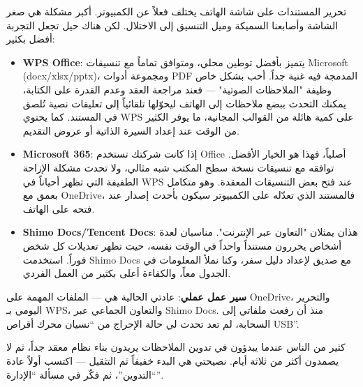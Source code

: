 


تحرير المستندات على شاشة الهاتف يختلف فعلاً عن الكمبيوتر. أكبر مشكلة هي صغر الشاشة وأصابعنا السميكة وميل التنسيق إلى الاختلال. لكن هناك حيل تجعل التجربة أفضل بكثير:

\begin{itemize}
  \item \textbf{WPS Office}: يتميز بأفضل توطين محلي، ومتوافق تماماً مع تنسيقات Microsoft (docx/xlsx/pptx)، ومجموعة أدوات PDF المدمجة فيه غنية جداً. أحب بشكل خاص وظيفة "الملاحظات الصوتية" — فعند مراجعة العقد وعدم القدرة على الكتابة، يمكنك التحدث ببضع ملاحظات إلى الهاتف ليحوّلها تلقائياً إلى تعليقات نصية تُلصق في المستند. كما يحتوي WPS على كمية هائلة من القوالب المجانية، ما يوفر الكثير من الوقت عند إعداد السيرة الذاتية أو عروض التقديم.
  \item \textbf{Microsoft 365}: إذا كانت شركتك تستخدم Office أصلياً، فهذا هو الخيار الأفضل. توافقه مع تنسيقات نسخة سطح المكتب شبه مثالي، ولا تحدث مشكلة الإزاحة الطفيفة التي تظهر أحياناً في WPS عند فتح بعض التنسيقات المعقدة. وهو متكامل بعمق مع OneDrive، فالمستند الذي تعدّله على الكمبيوتر سيكون بأحدث إصدار عند فتحه على الهاتف.
  \item \textbf{Shimo Docs/Tencent Docs}: هذان يمثلان "التعاون عبر الإنترنت". مناسبان لعدة أشخاص يحررون مستنداً واحداً في الوقت نفسه، حيث تظهر تعديلات كل شخص فوراً. استخدمت Shimo Docs مع صديق لإعداد دليل سفر، وكنا نملأ المعلومات في الجدول معاً، والكفاءة أعلى بكثير من العمل الفردي.
\end{itemize}

\textbf{سير عمل عملي}: عادتي الحالية هي — الملفات المهمة على OneDrive، والتحرير اليومي بـ WPS، والتعاون الجماعي عبر Shimo Docs. منذ أن رفعت ملفاتي إلى السحابة، لم تعد تحدث لي حالة الإحراج من “نسيان محرك أقراص USB”.


كثير من الناس عندما يبدؤون في تدوين الملاحظات يريدون بناء نظام معقد جداً، ثم لا يصمدون أكثر من ثلاثة أيام. نصيحتي هي البدء خفيفاً ثم التثقيل — اكتسب أولاً عادة “التدوين”، ثم فكّر في مسألة “الإدارة”.

